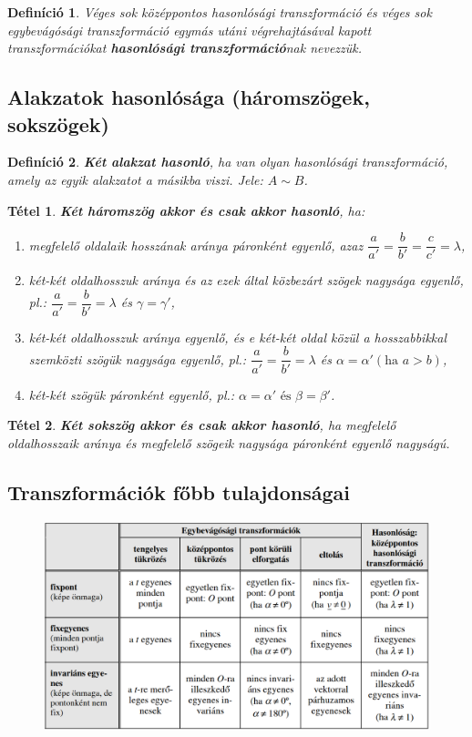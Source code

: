 \documentclass[12pt,a4paper]{article}
\newtheorem{theorem}{Tétel} [section]
\newtheorem{definition}{Definíció} [section]
\begin{document}
\begin{definition}
Véges sok középpontos hasonlósági transzformáció és véges sok egybevágósági transzformáció egymás utáni végrehajtásával kapott transzformációkat \textbf{hasonlósági transzformáció}nak nevezzük.
\end{definition}

\subsection{Alakzatok hasonlósága (háromszögek, sokszögek)}

\begin{definition}
\textbf{Két alakzat hasonló}, ha van olyan hasonlósági transzformáció, amely az egyik alakzatot a másikba viszi. Jele: $A \sim B$.
\end{definition}

\begin{theorem}
\textbf{Két háromszög akkor és csak akkor hasonló}, ha:
\begin{enumerate}
\item megfelelő oldalaik hosszának aránya páronként egyenlő, azaz $\dfrac{a}{a'}=\dfrac{b}{b'}=\dfrac{c}{c'}=\lambda$,
\item két-két oldalhosszuk aránya és az ezek által közbezárt szögek nagysága egyenlő, pl.: $\dfrac{a}{a'}=\dfrac{b}{b'}=\lambda$ és $\gamma = \gamma'$,
\item két-két oldalhosszuk aránya egyenlő, és e két-két oldal közül a hosszabbikkal szemközti szögük nagysága egyenlő, pl.: $\dfrac{a}{a'}=\dfrac{b}{b'}=\lambda$ és $\alpha = \alpha' (\text{ha } a>b)$,
\item két-két szögük páronként egyenlő, pl.: $\alpha = \alpha' \text{ és } \beta=\beta'$.
\end{enumerate}
\end{theorem}

\begin{theorem}
\textbf{Két sokszög akkor és csak akkor hasonló}, ha megfelelő oldalhosszaik aránya és megfelelő szögeik nagysága páronként egyenlő nagyságú.
\end{theorem}
\newpage
\subsection{Transzformációk főbb tulajdonságai}
\begin{figure}[h!]
\centering
\includegraphics[width=\textwidth]{geometry/transzformaciok_tul}
\end{figure}
\end{document}
